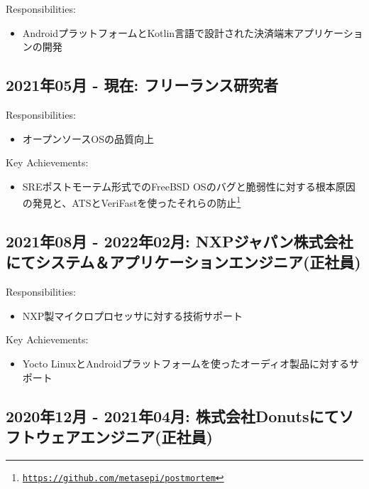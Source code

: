 \documentclass[letterpaper]{article}
\begin{document}
\noindent Responsibilities:

\begin{itemize}
  \item AndroidプラットフォームとKotlin言語で設計された決済端末アプリケーションの開発
\end{itemize}

\subsection*{2021年05月 - 現在: フリーランス研究者}

\noindent Responsibilities:

\begin{itemize}
  \item オープンソースOSの品質向上
\end{itemize}

\noindent Key Achievements:

\begin{itemize}
  \item SREポストモーテム形式でのFreeBSD OSのバグと脆弱性に対する根本原因の発見と、ATSとVeriFastを使ったそれらの防止\footnote{\href{https://github.com/metasepi/postmortem}{\tt https://github.com/metasepi/postmortem}}
\end{itemize}

\subsection*{2021年08月 - 2022年02月: NXPジャパン株式会社にてシステム＆アプリケーションエンジニア(正社員)}

\noindent Responsibilities:

\begin{itemize}
  \item NXP製マイクロプロセッサに対する技術サポート
\end{itemize}

\noindent Key Achievements:

\begin{itemize}
  \item Yocto LinuxとAndroidプラットフォームを使ったオーディオ製品に対するサポート
\end{itemize}

\subsection*{2020年12月 - 2021年04月: 株式会社Donutsにてソフトウェアエンジニア(正社員)}
\end{document}
